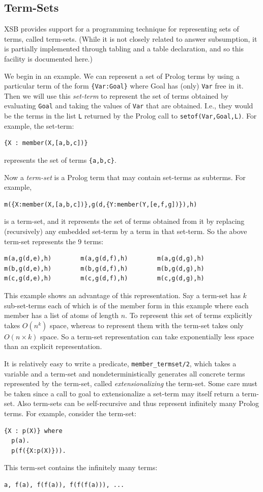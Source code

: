 \subsection{Term-Sets}

XSB provides support for a programming technique for representing sets
of terms, called term-sets.  (While it is not closely related to
answer subsumption, it is partially implemented through tabling and a
table declaration, and so this facility is documented here.)

We begin in an example.  We can represent a set of Prolog terms by
using a particular term of the form \verb|{Var:Goal}| where Goal has
(only) \verb|Var| free in it.  Then we will use this \emph{set-term} to
represent the set of terms obtained by evaluating \verb|Goal| and
taking the values of \verb|Var| that are obtained.  I.e., they would
be the terms in the list \verb|L| returned by the Prolog call to
\verb|setof(Var,Goal,L)|. For example, the set-term:
\begin{verbatim}
{X : member(X,[a,b,c])}
\end{verbatim}
represents the set of terms \verb|{a,b,c}|.

Now a \emph{term-set} is a Prolog term that may contain set-terms as
subterms.  For example,
\begin{verbatim}
m({X:member(X,[a,b,c])},g(d,{Y:member(Y,[e,f,g])}),h)
\end{verbatim}
is a term-set, and it represents the set of terms obtained from it by
replacing (recursively) any embedded set-term by a term in that
set-term.  So the above term-set represents the 9 terms:
\begin{verbatim}
m(a,g(d,e),h)        m(a,g(d,f),h)        m(a,g(d,g),h)
m(b,g(d,e),h)        m(b,g(d,f),h)        m(b,g(d,g),h)
m(c,g(d,e),h)        m(c,g(d,f),h)        m(c,g(d,g),h)
\end{verbatim}
This example shows an advantage of this representation.  Say a
term-set has $k$ sub-set-terms each of which is of the member form in
this example where each member has a list of atoms of length $n$.  To
represent this set of terms explicitly takes $O(n^k)$ space, whereas
to represent them with the term-set takes only $O(n \times k)$ space.  So a
term-set representation can take exponentially less space than an
explicit representation.

It is relatively easy to write a predicate, {\tt member\_termset/2},
which takes a variable and a term-set
and non\-deterministically generates all concrete terms represented by
the term-set, called \emph{extensionalizing} the term-set.  Some care
must be taken since a call to goal to extensionalize a set-term may
itself return a term-set.  Also term-sets can be self-recursive and
thus represent infinitely many Prolog terms.  For example, consider
the term-set:
\begin{verbatim}
{X : p(X)} where
  p(a).
  p(f({X:p(X)})).
\end{verbatim}
This term-set contains the infinitely many terms:
\begin{verbatim}
a, f(a), f(f(a)), f(f(f(a))), ...
\end{verbatim}

